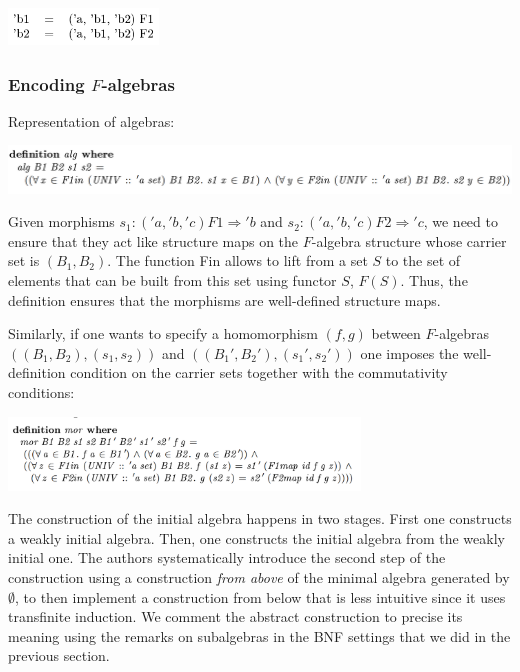 \includegraphics[width=0.3\textwidth]{img/equations.png}

\subsubsection{Encoding $F$-algebras}

Representation of algebras:

\includegraphics[width=\textwidth]{img/algebras.png}

Given morphisms $s_1: ('a, 'b, 'c) F1 \Rightarrow 'b$ and $s_2:  ('a, 'b, 'c) F2 \Rightarrow 'c$, we need to ensure that they act like structure maps on the $F$-algebra structure whose carrier set is $(B_1,B_2)$. The function Fin allows to lift from a set $S$ to the set of elements that can be built from this set using functor $S$, $F(S)$. Thus, the definition ensures that the morphisms are well-defined structure maps. 

Similarly, if one wants to specify a homomorphism $(f,g)$ between $F$-algebras $((B_1,B_2), (s_1,s_2))$ and $((B_1',B_2'), (s_1',s_2'))$ one imposes the well-definition condition on the carrier sets together with the commutativity conditions:

\includegraphics[width=0.7\textwidth]{img/morphisms.png}

The construction of the initial algebra happens in two stages. First one constructs  a weakly initial algebra. Then, one constructs the initial algebra from the weakly initial one. The authors systematically introduce the second step of the construction using a construction \textit{from above} of the minimal algebra generated by $\emptyset$, to then implement a construction from below that is less intuitive since it uses transfinite induction. We comment the abstract construction to precise its meaning using the remarks on subalgebras in the BNF settings that we did in the previous section. \\


